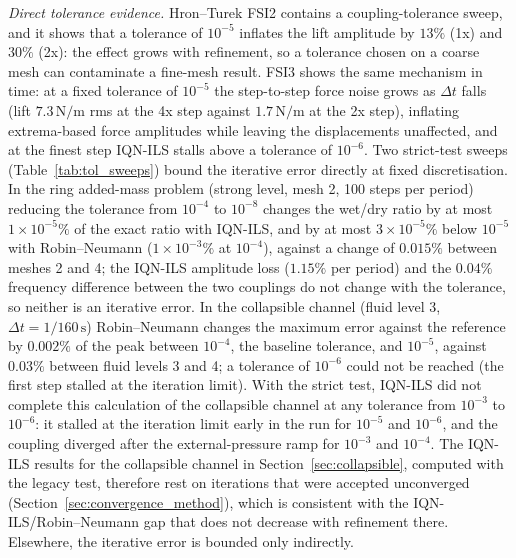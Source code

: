 \emph{Direct tolerance evidence.}
Hron--Turek FSI2 contains a coupling-tolerance sweep, and it shows that a tolerance of $10^{-5}$ inflates the lift amplitude by $13\%$ (1x) and $30\%$ (2x): the effect grows with refinement, so a tolerance chosen on a coarse mesh can contaminate a fine-mesh result.
FSI3 shows the same mechanism in time: at a fixed tolerance of $10^{-5}$ the step-to-step force noise grows as $\Delta t$ falls (lift $7.3\,\mathrm{N/m}$ rms at the 4x step against $1.7\,\mathrm{N/m}$ at the 2x step), inflating extrema-based force amplitudes while leaving the displacements unaffected, and at the finest step IQN-ILS stalls above a tolerance of $10^{-6}$.
Two strict-test sweeps (Table~\ref{tab:tol_sweeps}) bound the iterative error directly at fixed discretisation.
In the ring added-mass problem (strong level, mesh 2, 100 steps per period) reducing the tolerance from $10^{-4}$ to $10^{-8}$ changes the wet/dry ratio by at most $1\times10^{-5}\%$ of the exact ratio with IQN-ILS, and by at most $3\times10^{-5}\%$ below $10^{-5}$ with Robin--Neumann ($1\times10^{-3}\%$ at $10^{-4}$), against a change of $0.015\%$ between meshes 2 and 4; the IQN-ILS amplitude loss ($1.15\%$ per period) and the $0.04\%$ frequency difference between the two couplings do not change with the tolerance, so neither is an iterative error.
In the collapsible channel (fluid level 3, $\Delta t = 1/160\,\mathrm{s}$) Robin--Neumann changes the maximum error against the reference by $0.002\%$ of the peak between $10^{-4}$, the baseline tolerance, and $10^{-5}$, against $0.03\%$ between fluid levels 3 and 4; a tolerance of $10^{-6}$ could not be reached (the first step stalled at the iteration limit).
With the strict test, IQN-ILS did not complete this calculation of the collapsible channel at any tolerance from $10^{-3}$ to $10^{-6}$: it stalled at the iteration limit early in the run for $10^{-5}$ and $10^{-6}$, and the coupling diverged after the external-pressure ramp for $10^{-3}$ and $10^{-4}$.
The IQN-ILS results for the collapsible channel in Section~\ref{sec:collapsible}, computed with the legacy test, therefore rest on iterations that were accepted unconverged (Section~\ref{sec:convergence_method}), which is consistent with the IQN-ILS/Robin--Neumann gap that does not decrease with refinement there.
Elsewhere, the iterative error is bounded only indirectly.

